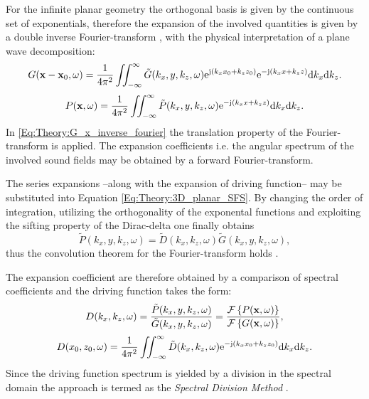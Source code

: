 For the infinite planar geometry the orthogonal basis is given by the continuous set of exponentials, therefore the expansion of the involved quantities is given by a double inverse Fourier-transform \cite{Ahrens2012, Arfken2005,Schultz2014:Comparing_approaches}, with the physical interpretation of a plane wave decomposition:
\begin{equation}
G(\mathbf{x} - \mathbf{x}_0,\omega) = \frac{1}{4\pi^2} \iint_{-\infty}^{\infty} \tilde{G}(k_x,y,k_z, \omega)  \mathrm{e}^{\mathrm{j} (k_x x_0 + k_z z_0)} \mathrm{e}^{-\mathrm{j} (k_x x + k_z z)} \mathrm{d} k_x \mathrm{d} k_z.
\label{Eq:Theory:G_x_inverse_fourier}
\end{equation}
\begin{equation}
P(\mathbf{x},\omega) = \frac{1}{4\pi^2} \iint_{-\infty}^{\infty} \tilde{P}(k_x,y,k_z, \omega) \mathrm{e}^{-\mathrm{j} (k_x x + k_z z)} \mathrm{d} k_x \mathrm{d} k_z.
\end{equation}
In \eqref{Eq:Theory:G_x_inverse_fourier} the translation property of the Fourier-transform is applied.
The expansion coefficients i.e. the angular spectrum of the involved sound fields may be obtained by a forward Fourier-transform.

The series expansions --along with the expansion of driving function-- may be substituted into Equation \eqref{Eq:Theory:3D_planar_SFS}. By changing the order of integration, utilizing the orthogonality of the exponental functions and exploiting the sifting property of the Dirac-delta one finally obtains
\begin{equation}
\tilde{P}(k_x,y,k_z, \omega) = \tilde{D}(k_x,k_z, \omega)  \tilde{G}(k_x,y,k_z, \omega),
\end{equation}
thus the convolution theorem for the Fourier-transform holds \cite{Girod2001}.

The expansion coefficient are therefore obtained by a comparison of spectral coefficients and the driving function takes the form:
\begin{equation}
D(k_x,k_z,\omega) = \frac{\tilde{P}(k_x,y,k_z, \omega)}{ \tilde{G}(k_x,y,k_z, \omega)} = 
\frac{\mathcal{F}\left\{ P(\mathbf{x},\omega) \right\} }
{  \mathcal{F}\left\{ G(\mathbf{x},\omega) \right\} },
\end{equation}
\begin{equation}
D(x_0,z_0,\omega) = \frac{1}{4\pi^2} \iint_{-\infty}^{\infty} \tilde{D}(k_x,k_z, \omega) \mathrm{e}^{-\mathrm{j} (k_x x_0 + k_z z_0)} \mathrm{d} k_x \mathrm{d} k_z.
\label{Eq:Theory:Dkx_inverse_Fourier}
\end{equation}
Since the driving function spectrum is yielded by a division in the spectral domain the approach is termed as the \emph{Spectral Division Method} \cite{Ahrens2010a, Ahrens2012:Ambisonics_for_planar_linear, Ahrens2011:icassp, Ahrens2010:Ambisonics_w_planar_linear}.

